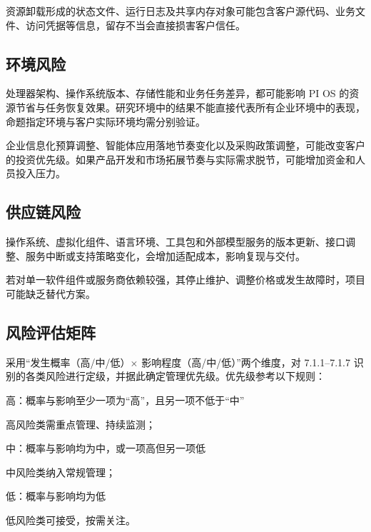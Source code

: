 资源卸载形成的状态文件、运行日志及共享内存对象可能包含客户源代码、业务文件、访问凭据等信息，留存不当会直接损害客户信任。

\subsection{环境风险}\label{sec:7.1.6}
处理器架构、操作系统版本、存储性能和业务任务差异，都可能影响 PI OS 的资源节省与任务恢复效果。研究环境中的结果不能直接代表所有企业环境中的表现，命题指定环境与客户实际环境均需分别验证。

企业信息化预算调整、智能体应用落地节奏变化以及采购政策调整，可能改变客户的投资优先级。如果产品开发和市场拓展节奏与实际需求脱节，可能增加资金和人员投入压力。

\subsection{供应链风险}\label{sec:7.1.7}
操作系统、虚拟化组件、语言环境、工具包和外部模型服务的版本更新、接口调整、服务中断或支持策略变化，会增加适配成本，影响复现与交付。

若对单一软件组件或服务商依赖较强，其停止维护、调整价格或发生故障时，项目可能缺乏替代方案。

\subsection{风险评估矩阵}\label{sec:7.1.8}
采用“发生概率（高/\allowbreak{}中/\allowbreak{}低）\ensuremath{\times} 影响程度（高/\allowbreak{}中/\allowbreak{}低）”两个维度，对 7.1.1--7.1.7 识别的各类风险进行定级，并据此确定管理优先级。优先级参考以下规则：

高：概率与影响至少一项为“高”，且另一项不低于“中”

高风险类需重点管理、持续监测；

中：概率与影响均为中，或一项高但另一项低

中风险类纳入常规管理；

低：概率与影响均为低

低风险类可接受，按需关注。

